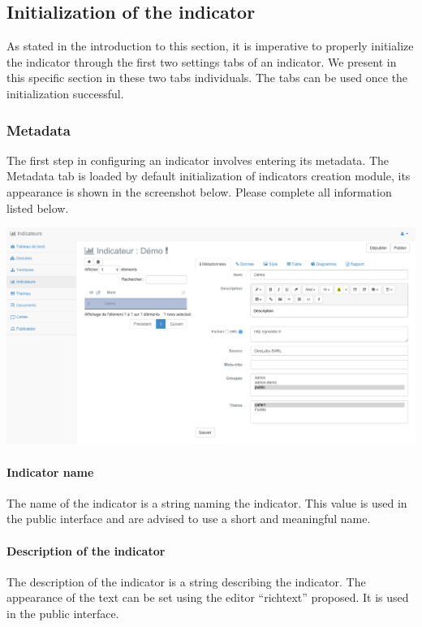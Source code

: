 \documentclass[letterpaper,10pt,english]{sphinxmanual}
\begin{document}
\subsection{Initialization of the indicator}
\label{indicators/indicatorspanel:initialisation-de-l-indicateur}
As stated in the introduction to this section, it is imperative to properly initialize the indicator through the first two settings tabs of an indicator. We present in this specific section in these two tabs individuals. The tabs can be used once the initialization successful.


\subsubsection{Metadata}
\label{indicators/indicatorspanel:metadonnees}
The first step in configuring an indicator involves entering its metadata. The Metadata tab is loaded by default initialization of indicators creation module, its appearance is shown in the screenshot below. Please complete all information listed below.

\includegraphics[width=1.000\linewidth]{indicator-metadata.png}


\paragraph{Indicator name}
\label{indicators/indicatorspanel:nom-de-l-indicateur}
The name of the indicator is a string naming the indicator. This value is used in the public interface and are advised to use a short and meaningful name.


\paragraph{Description of the indicator}
\label{indicators/indicatorspanel:description-de-l-indicateur}
The description of the indicator is a string describing the indicator. The appearance of the text can be set using the editor ``richtext'' proposed. It is used in the public interface.
\end{document}
